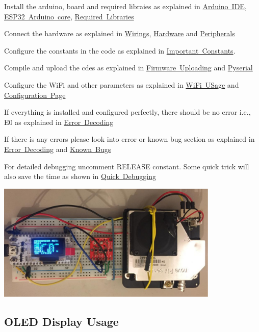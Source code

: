 \begin{DoxyItemize}
\item Install the arduino, board and required libraies as explained in \mbox{\hyperlink{index_arduinoide}{Arduino I\+DE}}, \mbox{\hyperlink{index_boardlib}{E\+S\+P32 Arduino core}}, \mbox{\hyperlink{index_lib}{Required Libraries}}
\item Connect the hardware as explained in \mbox{\hyperlink{index_wiring}{Wirings}}, \mbox{\hyperlink{index_hw_sec}{Hardware}} and \mbox{\hyperlink{index_peri}{Peripherals}}
\item Configure the constants in the code as explained in \mbox{\hyperlink{index_const}{Important Constants}}.
\item Compile and upload the cdes as explained in \mbox{\hyperlink{index_upload}{Firmware Uploading}} and \mbox{\hyperlink{index_dialout}{Pyserial}}
\item Configure the Wi\+Fi and other parameters as explained in \mbox{\hyperlink{index_wifi}{Wi\+Fi U\+Sage}} and \mbox{\hyperlink{index_configpage}{Configuration Page}}
\item If everything is installed and configured perfectly, there should be no error i.\+e., E0 as explained in \mbox{\hyperlink{index_errorenc}{Error Decoding}}
\item If there is any errors please look into error or known bug section as explained in \mbox{\hyperlink{index_errorenc}{Error Decoding}} and \mbox{\hyperlink{index_knownbugs}{Known Bugs}}
\item For detailed debugging uncomment R\+E\+L\+E\+A\+SE constant. Some quick trick will also save the time as shown in \mbox{\hyperlink{index_deb}{Quick Debugging}} \label{index_Fig-1}%
%
  
\begin{DoxyImage}
\includegraphics[width=400px]{board}
\end{DoxyImage}
 
\end{DoxyItemize}\hypertarget{index_oled}{}\subsection{O\+L\+E\+D Display Usage}\label{index_oled}
